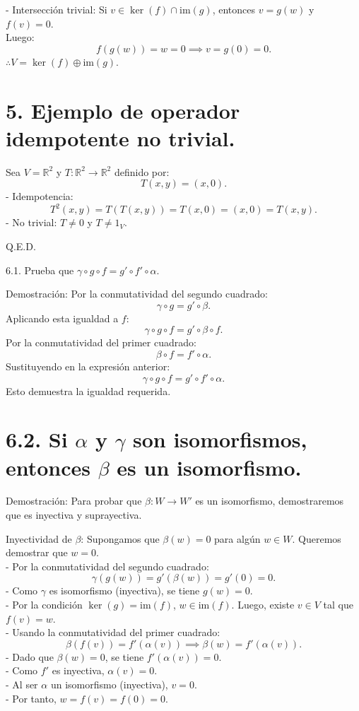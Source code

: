 \documentclass{article}
\begin{document}
- Intersección trivial: Si \(v \in \ker(f) \cap \text{im}(g)\), entonces \(v = g(w)\) y \(f(v) = 0\). \\Luego:
  \[
  f(g(w)) = w = 0 \implies v = g(0) = 0.
  \]  
  \( \therefore V = \ker(f) \oplus \text{im}(g)\).

\section{5. Ejemplo de operador idempotente no trivial.} 
Sea \(V = \mathbb{R}^2\) y \(T: \mathbb{R}^2 \to \mathbb{R}^2\) definido por:  
\[
T(x, y) = (x, 0).
\]  
- Idempotencia:  
  \[
  T^2(x, y) = T(T(x, y)) = T(x, 0) = (x, 0) = T(x, y).
  \]  
- No trivial: \(T \neq 0\) y \(T \neq 1_V\).  

Q.E.D.

6.1. Prueba que \(\gamma \circ g \circ f = g' \circ f' \circ \alpha\).  

Demostración:  
Por la conmutatividad del segundo cuadrado:  
\[
\gamma \circ g = g' \circ \beta.
\]  
Aplicando esta igualdad a \(f\):  
\[
\gamma \circ g \circ f = g' \circ \beta \circ f.
\]  
Por la conmutatividad del primer cuadrado:  
\[
\beta \circ f = f' \circ \alpha.
\]  
Sustituyendo en la expresión anterior:  
\[
\gamma \circ g \circ f = g' \circ f' \circ \alpha.
\]  
Esto demuestra la igualdad requerida.  

\section*{6.2. Si \(\alpha\) y \(\gamma\) son isomorfismos, entonces \(\beta\) es un isomorfismo.}  

Demostración:  
Para probar que \(\beta: W \to W'\) es un isomorfismo, demostraremos que es inyectiva y suprayectiva.  

Inyectividad de \(\beta\):  
Supongamos que \(\beta(w) = 0\) para algún \(w \in W\). Queremos demostrar que \(w = 0\).  \\
- Por la conmutatividad del segundo cuadrado:  
  \[
  \gamma(g(w)) = g'(\beta(w)) = g'(0) = 0.
  \]  
- Como \(\gamma\) es isomorfismo (inyectiva), se tiene \(g(w) = 0\).  \\
- Por la condición \(\ker(g) = \text{im}(f)\), \(w \in \text{im}(f)\). Luego, existe \(v \in V\) tal que \(f(v) = w\).  \\
- Usando la conmutatividad del primer cuadrado:  
  \[
  \beta(f(v)) = f'(\alpha(v)) \implies \beta(w) = f'(\alpha(v)).
  \]  
- Dado que \(\beta(w) = 0\), se tiene \(f'(\alpha(v)) = 0\).  \\
- Como \(f'\) es inyectiva, \(\alpha(v) = 0\).  \\
- Al ser \(\alpha\) un isomorfismo (inyectiva), \(v = 0\).  \\
- Por tanto, \(w = f(v) = f(0) = 0\).  
\end{document}
